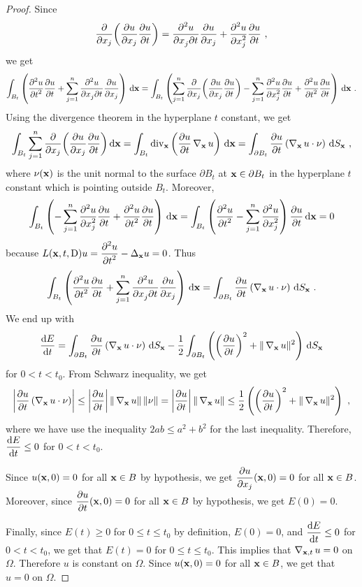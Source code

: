 \begin{proof}
Since
\[
\pdfdx{ \left( \pdydx{u}{x_j} \pdydx{u}{t} \right) }{x_j}
= \pdydxnm{u}{x_j}{t}{2}{}{} \pdydx{u}{x_j} + \pdydxn{u}{x_j}{2}
\pdydx{u}{t} \ ,
\]
we get
\[
\int_{B_t} \left( \pdydxn{u}{t}{2} \pdydx{u}{t} +
\sum_{j=1}^n \pdydxnm{u}{x_j}{t}{2}{}{} \pdydx{u}{x_j} \right)
\dx{\VEC{x}}
= \int_{B_t} \left( \sum_{j=1}^n
\pdfdx{ \left( \pdydx{u}{x_j} \pdydx{u}{t} \right) }{x_j}
- \sum_{j=1}^n \pdydxn{u}{x_j}{2} \pdydx{u}{t} + 
\pdydxn{u}{t}{2} \pdydx{u}{t} \right) \dx{\VEC{x}} \ .
\]
Using the divergence theorem in the hyperplane $t$ constant, we get
\[
\int_{B_t} \sum_{j=1}^n
\pdfdx{ \left( \pdydx{u}{x_j} \pdydx{u}{t} \right) }{x_j} \dx{\VEC{x}}
= \int_{B_t} \diV_\VEC{x} \left( \pdydx{u}{t} \graD_{\VEC{x}} u \right)
\dx{\VEC{x}}
= \int_{\partial B_t} \pdydx{u}{t} \left( \graD_{\VEC{x}} u \cdot
\VEC{\nu} \right) \dss{S}{x} \  ,
\]
where $\VEC{\nu}(\VEC{x})$ is the unit normal to the surface
$\partial B_t$ at $\VEC{x} \in \partial B_t$ in the hyperplane $t$
constant which is pointing outside $B_t$.
Moreover,
\[
\int_{B_t} \left( - \sum_{j=1}^n \pdydxn{u}{x_j}{2} \pdydx{u}{t} + 
\pdydxn{u}{t}{2} \pdydx{u}{t} \right) \dx{\VEC{x}} =
\int_{B_t} \left( \pdydxn{u}{t}{2} -
\sum_{j=1}^n \pdydxn{u}{x_j}{2} \right) \pdydx{u}{t} \dx{\VEC{x}} = 0
\]
because
$\displaystyle L(\VEC{x},t,\diff) u = \pdydxn{u}{t}{2} -
\Delta_{\VEC{x}} u = 0$.
Thus
\[
\int_{B_t} \left( \pdydxn{u}{t}{2} \pdydx{u}{t} +
\sum_{j=1}^n \pdydxnm{u}{x_j}{t}{2}{}{} \pdydx{u}{x_j} \right)
\dx{\VEC{x}} =
\int_{\partial B_t} \pdydx{u}{t} \left( \graD_{\VEC{x}} u \cdot
\VEC{\nu} \right) \dss{S}{x} \ .
\]
We end up with
\[
\dydx{E}{t} = \int_{\partial B_t} \pdydx{u}{t} \left( \graD_{\VEC{x}} u \cdot
\VEC{\nu} \right) \dss{S}{x}
- \frac{1}{2} \int_{\partial B_t} \left( \left(\pdydx{u}{t}\right)^2 
+ \|\graD_{\VEC{x}} u \|^2 \right)\dss{S}{x}
\]
for $0 <t < t_0$.  From Schwarz inequality, we get
\[
\left| \pdydx{u}{t} \left(\graD_{\VEC{x}} u \cdot \VEC{\nu} \right) \right|
 \leq \left| \pdydx{u}{t} \right| \| \graD_{\VEC{x}} u \|\,\|\VEC{\nu}\|
= \left| \pdydx{u}{t} \right| \| \graD_{\VEC{x}} u \|
\leq \frac{1}{2} \left( \left(\pdydx{u}{t}\right)^2 +
\|\graD_{\VEC{x}} u \|^2 \right) \ ,
\]
where we have use the inequality $2ab \leq a^2 + b^2$ for the last
inequality.  Therefore,
$\displaystyle \dydx{E}{t} \leq 0$ for $0 <t < t_0$.

Since $u(\VEC{x},0)=0$ for all $\VEC{x} \in B$ by hypothesis, we get
$\displaystyle \pdydx{u}{x_j}(\VEC{x},0) = 0$ for all $\VEC{x} \in B$.
Moreover, since $\displaystyle \pdydx{u}{t}(\VEC{x},0)=0$ for all
$\VEC{x} \in B$ by hypothesis, we get $E(0)=0$.

Finally, since $E(t) \geq 0$ for $0 \leq t \leq t_0$ by definition,
$E(0) = 0$, and $\displaystyle \dydx{E}{t} \leq 0$ for $0 <t < t_0$,
we get that $E(t) = 0$ for $0 \leq t \leq t_0$.  This implies that
$\graD_{\VEC{x},t} u = 0$ on $\Omega$.  Therefore $u$ is constant on
$\Omega$.  Since $u(\VEC{x},0)=0$ for all $\VEC{x} \in B$, we get that
$u=0$ on $\Omega$.
\end{proof}

